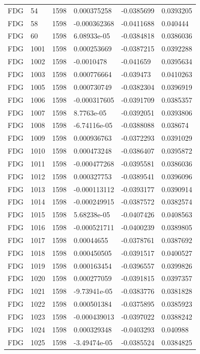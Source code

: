 \begin{longtable}{llllll}
FDG & 54 & 1598 & 0.000375258 & -0.0385699 & 0.0393205 \\
FDG & 58 & 1598 & -0.000362368 & -0.0411688 & 0.040444 \\
FDG & 60 & 1598 & 6.08933e-05 & -0.0384818 & 0.0386036 \\
FDG & 1001 & 1598 & 0.000253669 & -0.0387215 & 0.0392288 \\
FDG & 1002 & 1598 & -0.0010478 & -0.041659 & 0.0395634 \\
FDG & 1003 & 1598 & 0.000776664 & -0.039473 & 0.0410263 \\
FDG & 1005 & 1598 & 0.000730749 & -0.0382304 & 0.0396919 \\
FDG & 1006 & 1598 & -0.000317605 & -0.0391709 & 0.0385357 \\
FDG & 1007 & 1598 & 8.7763e-05 & -0.0392051 & 0.0393806 \\
FDG & 1008 & 1598 & -6.74116e-05 & -0.0388088 & 0.038674 \\
FDG & 1009 & 1598 & 0.000936763 & -0.0372293 & 0.0391029 \\
FDG & 1010 & 1598 & 0.000473248 & -0.0386407 & 0.0395872 \\
FDG & 1011 & 1598 & -0.000477268 & -0.0395581 & 0.0386036 \\
FDG & 1012 & 1598 & 0.000327753 & -0.0389541 & 0.0396096 \\
FDG & 1013 & 1598 & -0.000113112 & -0.0393177 & 0.0390914 \\
FDG & 1014 & 1598 & -0.000249915 & -0.0387572 & 0.0382574 \\
FDG & 1015 & 1598 & 5.68238e-05 & -0.0407426 & 0.0408563 \\
FDG & 1016 & 1598 & -0.000521711 & -0.0400239 & 0.0389805 \\
FDG & 1017 & 1598 & 0.00044655 & -0.0378761 & 0.0387692 \\
FDG & 1018 & 1598 & 0.000450505 & -0.0391517 & 0.0400527 \\
FDG & 1019 & 1598 & 0.000163454 & -0.0396557 & 0.0399826 \\
FDG & 1020 & 1598 & 0.000277059 & -0.0391815 & 0.0397357 \\
FDG & 1021 & 1598 & -9.73941e-05 & -0.0383776 & 0.0381828 \\
FDG & 1022 & 1598 & 0.000501384 & -0.0375895 & 0.0385923 \\
FDG & 1023 & 1598 & -0.000439013 & -0.0397022 & 0.0388242 \\
FDG & 1024 & 1598 & 0.000329348 & -0.0403293 & 0.040988 \\
FDG & 1025 & 1598 & -3.49474e-05 & -0.0385524 & 0.0384825 \\

\end{longtable}
